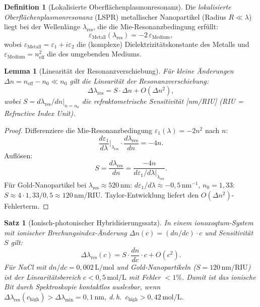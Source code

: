 ﻿\documentclass[a4paper,12pt]{article}
\theoremstyle{plain}
\newtheorem{satz}{Satz}
\newtheorem{lemma}{Lemma}
\theoremstyle{definition}
\newtheorem{definition}{Definition}
\theoremstyle{remark}
\begin{document}
\begin{definition}[Lokalisierte Oberfl\"achenplasmonresonanz]
\label{def:lspr}
Die \emph{lokalisierte Oberfl\"achenplasmonresonanz} (LSPR) metallischer
Nanopartikel (Radius $R \ll \lambda$) liegt bei der Wellenl\"ange $\lambda_{\mathrm{res}}$,
die die Mie-Resonanzbedingung erf\"ullt:
\[
\varepsilon_{\mathrm{Metall}}(\lambda_{\mathrm{res}}) = -2\,\varepsilon_{\mathrm{Medium}},
\]
wobei $\varepsilon_{\mathrm{Metall}} = \varepsilon_1 + i\varepsilon_2$ die
(komplexe) Dielektrizit\"atskonstante des Metalls und
$\varepsilon_{\mathrm{Medium}} = n_{\mathrm{eff}}^2$ die des umgebenden Mediums.
\end{definition}

\begin{lemma}[Linearit\"at der Resonanzverschiebung]
\label{lem:linear_shift}
F\"ur kleine \"Anderungen $\Delta n = n_{\mathrm{eff}} - n_0 \ll n_0$ gilt
die Linearit\"at der Resonanzverschiebung:
\[
\Delta\lambda_{\mathrm{res}} = S \cdot \Delta n + O(\Delta n^2),
\]
wobei $S = d\lambda_{\mathrm{res}}/dn|_{n=n_0}$ die \emph{refraktometrische Sensitivit\"at}
[nm/RIU] (RIU = Refractive Index Unit).
\end{lemma}

\begin{proof}
Differenziere die Mie-Resonanzbedingung $\varepsilon_1(\lambda) = -2n^2$ nach $n$:
\[
\frac{d\varepsilon_1}{d\lambda}\bigg|_{\lambda_{\mathrm{res}}} \cdot \frac{d\lambda_{\mathrm{res}}}{dn}
= -4n.
\]
Aufl\"osen:
\[
S = \frac{d\lambda_{\mathrm{res}}}{dn} = \frac{-4n}{d\varepsilon_1/d\lambda\big|_{\lambda_{\mathrm{res}}}}.
\]
F\"ur Gold-Nanopartikel bei $\lambda_{\mathrm{res}} \approx 520\,\text{nm}$:
$d\varepsilon_1/d\lambda \approx -0{,}5\,\text{nm}^{-1}$, $n_0 = 1{,}33$:
$S \approx 4 \cdot 1{,}33/0{,}5 \approx 120\,\text{nm/RIU}$.
Taylor-Entwicklung liefert den $O(\Delta n^2)$-Fehlerterm.
\end{proof}

\begin{satz}[Ionisch-photonischer Hybridisierungssatz]
\label{satz:hybrid}
In einem ionoxoqtum-System mit ionischer Brechungsindex-\"Anderung
$\Delta n(c) = (dn/dc) \cdot c$ und Sensitivit\"at $S$ gilt:
\[
\Delta\lambda_{\mathrm{res}}(c) = S \cdot \frac{dn}{dc} \cdot c + O(c^2).
\]
F\"ur NaCl mit $dn/dc = 0{,}002\,\text{L/mol}$ und Gold-Nanopartikeln
($S = 120\,\text{nm/RIU}$) ist der Linearit\"atsbereich $c < 0{,}5\,\text{mol/L}$
mit Fehler $< 1\%$.
Damit ist das ionische Bit durch Spektroskopie kontaktlos auslesbar,
wenn $\Delta\lambda_{\mathrm{res}}(c_{\mathrm{high}}) > \Delta\lambda_{\min} = 0{,}1\,\text{nm}$,
d.\,h.\ $c_{\mathrm{high}} > 0{,}42\,\text{mol/L}$.
\end{satz}
\end{document}
